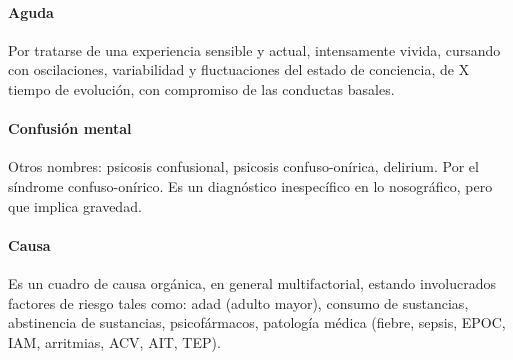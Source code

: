 \paragraph{Aguda}
Por tratarse de una experiencia sensible y actual, intensamente vivida, cursando con oscilaciones, variabilidad y fluctuaciones del estado de conciencia, de X tiempo de evolución, con compromiso de las conductas basales.
\paragraph{Confusión mental}
Otros nombres: psicosis confusional, psicosis confuso-onírica, delirium.
Por el síndrome confuso-onírico. Es un diagnóstico inespecífico en lo nosográfico, pero que implica gravedad.
\paragraph{Causa}
Es un cuadro de causa orgánica, en general multifactorial, estando involucrados factores de riesgo tales como: adad (adulto mayor), consumo de sustancias, abstinencia de sustancias, psicofármacos, patología médica (fiebre, sepsis, EPOC, IAM, arritmias, ACV, AIT, TEP).
